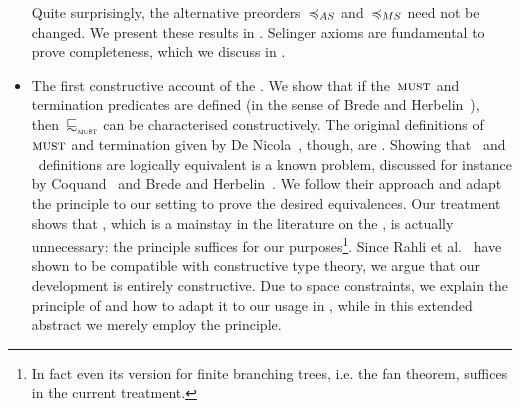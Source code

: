 \begin{itemize}
  \noindent
  Quite surprisingly, the alternative preorders~$\asleq$ and~$\msleq$
  need not be changed. We present these results in .
  Selinger axioms are fundamental to prove completeness,
  which we discuss in .

  \item %
  The first constructive account of the \mustpreorder.
  We show that if the~$\operatorname{\textsc{must}}$ and termination
  predicates are defined {\em \intentionally} (in the sense of
  Brede and Herbelin~\cite{DBLP:conf/lics/BredeH21}),
  then~$\testleqS$ can be characterised constructively.
  The original definitions of~$\operatorname{\textsc{must}}$ and termination given
  by De Nicola~\cite{DBLP:journals/tcs/NicolaH84}, though, are {\em \extensional}.
  Showing that \intentional\ and \extensional\ definitions are logically
  equivalent is a known problem, discussed for instance by
  Coquand~\cite{notecoquand} and Brede and Herbelin~\cite{DBLP:conf/lics/BredeH21}.
  We follow their approach and adapt the \barinduction principle
  to our setting to prove the desired equivalences.
  Our treatment shows that \koenigslemma, which is a mainstay in the literature
  on the \mustpreorder, is actually unnecessary: the \barinduction
  principle suffices for our purposes\footnote{In fact even its
  version for finite branching
  trees, i.e. the fan theorem, suffices in the current treatment.}.
  Since Rahli et al.~\cite{DBLP:journals/jacm/RahliBCC19} have shown \barinduction
  to be compatible  with constructive type theory, we argue %
  that our development is entirely constructive.
  Due to space constraints, we explain the principle of \barinduction
  and how to adapt it to our usage in , while in
  this extended abstract we merely employ the principle.


\end{itemize}
